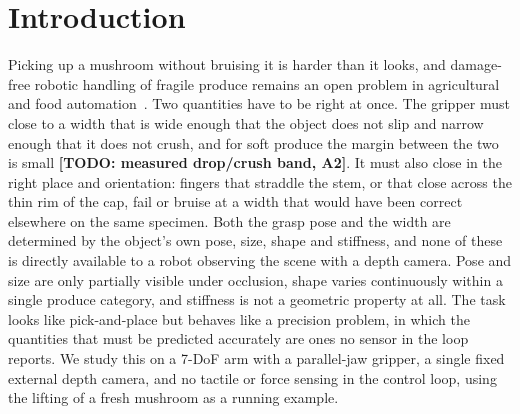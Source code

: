 %
\section{Introduction}
\label{sec:intro}

Picking up a mushroom without bruising it is harder than it looks, and damage-free robotic
handling of fragile produce remains an open problem in agricultural and food
automation~\citep{wang2025damageless}. Two quantities have to be right at once. The gripper
must close to a width that is wide enough that the object does not slip and narrow enough that
it does not crush, and for soft produce the margin between the two is small
\textbf{[TODO: measured drop/crush band, A2]}. It must also close in the right place and
orientation: fingers that straddle the stem, or that close across the thin rim of the cap,
fail or bruise at a width that would have been correct elsewhere on the same specimen. Both
the grasp pose and the width are determined by the object's own pose, size, shape and
stiffness, and none of these is directly available to a robot observing the scene with a depth
camera. Pose and size are only partially visible under occlusion, shape varies continuously
within a single produce category, and stiffness is not a geometric property at all. The task
looks like pick-and-place but behaves like a precision problem, in which the quantities that
must be predicted accurately are ones no sensor in the loop reports. We study this on a 7-DoF
arm with a parallel-jaw gripper, a single fixed external depth camera, and no tactile or force
sensing in the control loop, using the lifting of a fresh mushroom as a running example.


